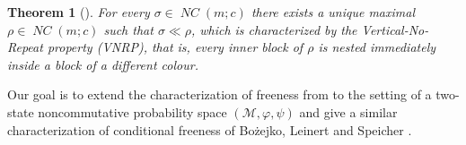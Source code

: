 \documentclass[12pt]{amsart}
\DeclareMathOperator{\NC}{\mathit{NC}} %
\DeclareMathOperator{\NCirr}{{\mathit{NC}^\textit{irr}}} %
\newtheorem{theorem}{Theorem}[section]
\newtheorem{proposition}[theorem]{Proposition}
\theoremstyle{definition}
\numberwithin{equation}{section}
\begin{document}
\begin{theorem}[{\cite[Theorem 1.1]{FMNS2}}]
  \label{thm:vnrp}
  \noindent
  For every $\sigma \in \NC(m; c)$ there exists a unique maximal $\rho \in \NC(m;
  c)$ such that $\sigma \ll \rho$, which is characterized by the
  \emph{Vertical-No-Repeat property (VNRP)}, that is,
  every inner block of $\rho$ is nested immediately inside a block of a different colour.
\end{theorem}
%		
%		
%		
%		
Our goal is to extend the characterization of freeness from \cite{FMNS2} to the setting of a two-state
noncommutative probability space $(\mathcal{M},\varphi,\psi)$ and give a similar characterization of conditional freeness of Bożejko, Leinert and Speicher
\cite{BozejkoLeinertSpeicher:1996:convolution}.
\end{document}
